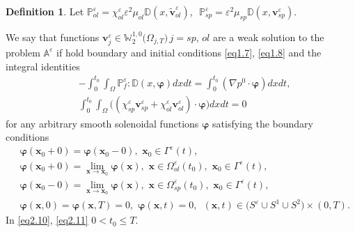 \documentclass{article}
\theoremstyle{plain}
\theoremstyle{definition}
\newtheorem{definition}[theorem]{Definition}
\numberwithin{equation}{section}
\begin{document}
\begin{definition}\label{d2.11}
Let
$\mathbb{P}^{\varepsilon}_{ol}=\chi^{\varepsilon}_{ol}\varepsilon^{2}\mu_{ol}
\mathbb{D}(x,\widetilde{\boldsymbol{v}}_{ol}^{\varepsilon})$,
\,\,$\mathbb{P}^{\varepsilon}_{sp}=\varepsilon^{2}\mu_{sp}
\mathbb{D}(x,\boldsymbol{v}_{sp}^{\varepsilon})$.

We say that functions
$\boldsymbol{v}^{\varepsilon}_{j}
\in\mathbb{W}^{1,0}_{2}\big(\Omega_{j,T}\big)\,j=sp,\,ol$ are a weak solution to the problem $\mathbb{A}^{\varepsilon}$
if hold boundary and initial conditions \eqref{eq1.7}, \eqref{eq1.8} and the integral identities
\begin{equation}\label{eq2.10}
\begin{aligned}
&
-\int_{0}^{t_{0}}\int_{\Omega}\mathbb{P}^{\varepsilon}_{f}:\mathbb{D}(x,\boldsymbol{\varphi})dxdt=
\int_{0}^{t_{0}}(\nabla{p}^{0}\cdot\boldsymbol{\varphi})dxdt,
\\
& \int_{0}^{t_{0}}\int_{\Omega}\big((\chi^{\varepsilon}_{sp}
\boldsymbol{v}^{\varepsilon}_{sp}+\chi^{\varepsilon}_{ol}
\boldsymbol{v}^{\varepsilon}_{ol})\cdot\boldsymbol{\varphi}\big)dxdt=0
\end{aligned}
\end{equation}
for any arbitrary smooth solenoidal functions $\boldsymbol{\varphi}$ satisfying the boundary conditions
\begin{equation}\label{eq2.11}
\begin{aligned}
&
\boldsymbol{\varphi}(\boldsymbol{x}_{0}+0)=\boldsymbol{\varphi}(\boldsymbol{x}_{0}-0),\,\,
\boldsymbol{x}_{0}\in\Gamma^{\varepsilon}(t),
\\
& \boldsymbol{\varphi}(\boldsymbol{x}_{0}+0)=
\lim_{\boldsymbol{x}\rightarrow\boldsymbol{x}_{0}}\boldsymbol{\varphi}(\boldsymbol{x}),
\,\,\boldsymbol{x}\in\Omega^{\varepsilon}_{ol}(t_{0}),\,\,
\boldsymbol{x}_{0}\in\Gamma^{\varepsilon}(t),
\\
& \boldsymbol{\varphi}(\boldsymbol{x}_{0}-0)=
\lim_{\boldsymbol{x}\rightarrow\boldsymbol{x}_{0}}
\boldsymbol{\varphi}(\boldsymbol{x}),\,\,\boldsymbol{x}\in \Omega^{\varepsilon}_{sp}(t_{0}),\,\,
\boldsymbol{x}_{0}\in \Gamma^{\varepsilon}(t),
\\
& \boldsymbol{\varphi}(\boldsymbol{x},0)=\boldsymbol{\varphi}(\boldsymbol{x},T)=0,\,\,
\boldsymbol{\varphi}(\boldsymbol{x},t)=0,\,\,\,(\boldsymbol{x},t)
\in\big({S}^{\varepsilon}\cup{S}^{1}\cup{S}^{2}\big)\times(0,T).
\end{aligned}
\end{equation}
In \eqref{eq2.10}, \eqref{eq2.11} $0<t_{0}\leqslant{T}$.
\end{definition}
\end{document}
